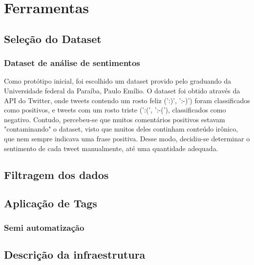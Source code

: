 \chapter[Ferramentas]{Ferramentas}

\section{Seleção do Dataset}

\subsection{Dataset de análise de sentimentos}
Como protótipo inicial, foi escolhido um dataset provido pelo graduando da Universidade federal da Paraíba, Paulo Emílio. O dataset foi obtido através da API do Twitter, onde tweets contendo um rosto feliz (':)', ':-)') foram classificados como positivos, e tweets com um rosto triste (':(', ':-('), classificados como negativo. Contudo, percebeu-se que muitos comentários positivos estavam "contaminando" o dataset, visto que muitos deles continham conteúdo irônico, que nem sempre indicava uma frase positiva. Desse modo, decidiu-se determinar o sentimento de cada tweet manualmente, até uma quantidade adequada.


\section{Filtragem dos dados}

\section{Aplicação de Tags}

\subsection{Semi automatização}

\section{Descrição da infraestrutura}

